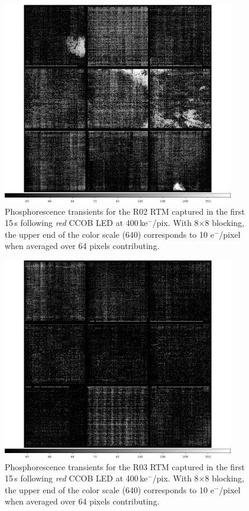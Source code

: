 \begin{figure}[!htbp]
\centering
\includegraphics[width=0.9\textwidth]{figures/phosphorescence-survey/itl_fluor_R02_0-19_rb1_log.png}
\caption{Phosphorescence transients for the R02 RTM captured in the first 15\,s following {\it red} CCOB LED at 400\,ke$^-$/pix. With 8$\times$8 blocking, the upper end of the color scale (640) corresponds to 10 e$^-$/pixel when averaged over 64 pixels contributing.}
\label{fig:phos:R02}
\end{figure}

\begin{figure}[!htbp]
\centering
\includegraphics[width=0.9\textwidth]{figures/phosphorescence-survey/itl_fluor_R03_0-19_rb1_log.png}
\caption{Phosphorescence transients for the R03 RTM captured in the first 15\,s following {\it red} CCOB LED at 400\,ke$^-$/pix. With 8$\times$8 blocking, the upper end of the color scale (640) corresponds to 10 e$^-$/pixel when averaged over 64 pixels contributing.}
\label{fig:phos:R03}
\end{figure}

